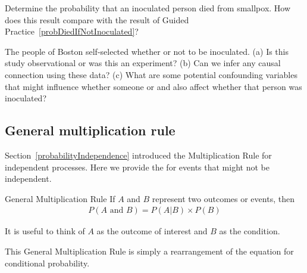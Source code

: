 \begin{exercisewrap}
\begin{nexercise}
Determine the probability that an inoculated person died from smallpox. How does this result compare with the result of Guided Practice~\ref{probDiedIfNotInoculated}?\footnotemark
\end{nexercise}
\end{exercisewrap}

\begin{exercisewrap}
\begin{nexercise}\label{SmallpoxInoculationObsExpExercise}
The people of Boston self-selected whether or not to be inoculated. (a) Is this study observational or was this an experiment? (b) Can we infer any causal connection using these data? (c) What are some potential confounding variables that might influence whether someone  or  and also affect whether that person was inoculated?\footnotemark
\end{nexercise}
\end{exercisewrap}


\subsection{General multiplication rule}

Section~\ref{probabilityIndependence} introduced the Multiplication Rule for independent processes. Here we provide the  for events that might not be independent.

\begin{onebox}{General Multiplication Rule}
If $A$ and $B$ represent two outcomes or events, then \vspace{-1.5mm}
\begin{eqnarray*}
P(A\text{ and }B) = P(A | B)\times P(B)
\end{eqnarray*} \vspace{-6.5mm} \par
It is useful to think of $A$ as the outcome of interest and $B$ as the condition.
\end{onebox}
This General Multiplication Rule is simply a rearrangement of the equation for conditional probability.


